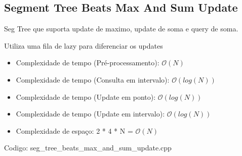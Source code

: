 \documentclass[10pt, a4paper, oneside]{book}
\begin{document}
\subsection{Segment Tree Beats Max And Sum Update}


Seg Tree que suporta update de maximo, update de soma e query de soma.

Utiliza uma fila de lazy para diferenciar os updates



\begin{itemize}
\item Complexidade de tempo (Pré-processamento): $\mathcal{O}(N)$
\item Complexidade de tempo (Consulta em intervalo): $\mathcal{O}(log(N))$
\item Complexidade de tempo (Update em ponto): $\mathcal{O}(log(N))$
\item Complexidade de tempo (Update em intervalo): $\mathcal{O}(log(N))$
\item Complexidade de espaço: 2 * 4 * N = $\mathcal{O}(N)$
\end{itemize}

\hfill

Codigo: seg\_tree\_beats\_max\_and\_sum\_update.cpp
\end{document}
